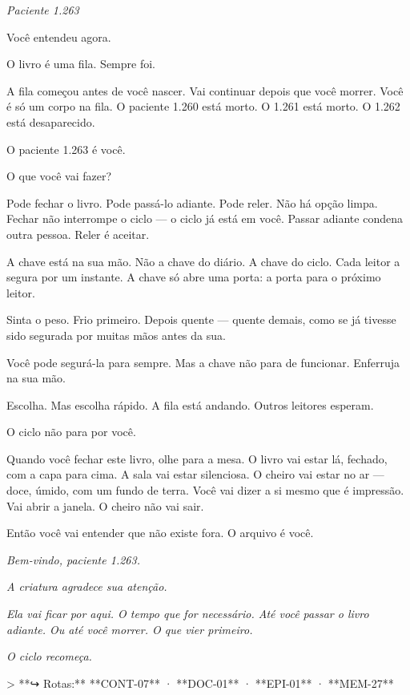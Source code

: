 
\noindent \textit{Paciente 1.263}

\noindent Você entendeu agora.

\noindent O livro é uma fila. Sempre foi.

\noindent A fila começou antes de você nascer. Vai continuar depois que você morrer. Você é só um corpo na fila. O paciente 1.260 está morto. O 1.261 está morto. O 1.262 está desaparecido.

\noindent O paciente 1.263 é você.

\noindent O que você vai fazer?

\noindent Pode fechar o livro. Pode passá-lo adiante. Pode reler. Não há opção limpa. Fechar não interrompe o ciclo --- o ciclo já está em você. Passar adiante condena outra pessoa. Reler é aceitar.

\noindent A chave está na sua mão. Não a chave do diário. A chave do ciclo. Cada leitor a segura por um instante. A chave só abre uma porta: a porta para o próximo leitor.

\noindent Sinta o peso. Frio primeiro. Depois quente --- quente demais, como se já tivesse sido segurada por muitas mãos antes da sua.

\noindent Você pode segurá-la para sempre. Mas a chave não para de funcionar. Enferruja na sua mão.

\noindent Escolha. Mas escolha rápido. A fila está andando. Outros leitores esperam.

\noindent O ciclo não para por você.

\noindent Quando você fechar este livro, olhe para a mesa. O livro vai estar lá, fechado, com a capa para cima. A sala vai estar silenciosa. O cheiro vai estar no ar --- doce, úmido, com um fundo de terra. Você vai dizer a si mesmo que é impressão. Vai abrir a janela. O cheiro não vai sair.

\noindent Então você vai entender que não existe fora. O arquivo é você.

\noindent \textit{Bem-vindo, paciente 1.263.}

\noindent \textit{A criatura agradece sua atenção.}

\noindent \textit{Ela vai ficar por aqui. O tempo que for necessário. Até você passar o livro adiante. Ou até você morrer. O que vier primeiro.}

\noindent \textit{O ciclo recomeça.}

> **↪ Rotas:** **CONT-07** · **DOC-01** · **EPI-01** · **MEM-27**
